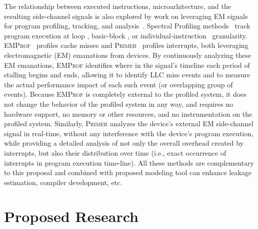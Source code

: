 \documentclass[11 pt]{article}
\begin{document}
The relationship between executed instructions, microarhitecture, and the resulting side-channel signals is also explored by work on leveraging EM signals for program profiling, tracking, and analysis~\cite{7783762,Gorman:2017:AON:3123939.3123973,Elvan2021,Zop, Zop2,Moumita2018,Moumita2022}. Spectral Profiling methods~\cite{7783762,Zop,Zop2,Elvan2021} track program execution at loop \cite{7783762}, basic-block \cite{Zop,Zop2}, or individual-instruction~\cite{Elvan2021} granularity.
\textsc{EMProf}~\cite{Moumita2018} profiles cache misses and \textsc{Primer}~\cite{Moumita2022} profiles interrupts, both leveraging electromagnetic (EM) emanations from devices. By continuously analyzing these EM emanations, \textsc{EMProf} identifies where in the signal's timeline each period of stalling begins and ends, allowing it to identify LLC miss events and to measure the actual performance impact of each such event (or overlapping group of events). Because \textsc{EMProf} is completely external to the profiled system, it does not change the behavior of the profiled system in any way, and requires no hardware support, no memory or other resources, and no instrumentation on the profiled system. Similarly, \textsc{Primer} analyzes the device's external EM side-channel signal in real-time, without any interference with the device's program execution, while providing a detailed analysis of not only the overall overhead created by interrupts, but also their distribution over time (i.e., exact occurrence of interrupts in program execution time-line). All these methods are complementary to this proposal and combined with proposed modeling tool can enhance leakage estimation, compiler development, etc.

\section{Proposed Research}
\label{sec:proposed}


\end{document}
